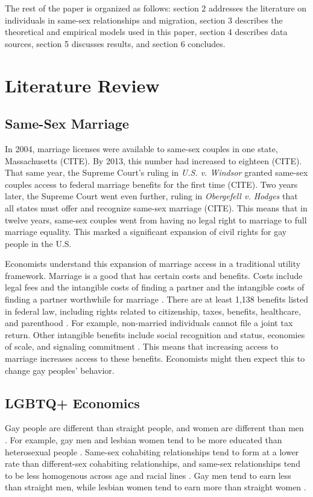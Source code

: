 \documentclass[12pt,letterpaper]{article}
\begin{document}
The rest of the paper is organized as follows: section 2 addresses the literature on individuals in same-sex relationships and migration, section 3 describes the theoretical and empirical models used in this paper, section 4 describes data sources, section 5 discusses results, and section 6 concludes.

\section{Literature Review}
\subsection{Same-Sex Marriage}
In 2004, marriage licenses were available to same-sex couples in one state, Massachusetts (CITE). By 2013, this number had increased to eighteen (CITE). That same year, the Supreme Court's ruling in \textit{U.S. v. Windsor} granted same-sex couples access to federal marriage benefits for the first time (CITE). Two years later, the Supreme Court went even further, ruling in \textit{Obergefell v. Hodges} that all states must offer and recognize same-sex marriage (CITE). This means that in twelve years, same-sex couples went from having no legal right to marriage to full marriage equality. This marked a significant expansion of civil rights for gay people in the U.S.

Economists understand this expansion of marriage access in a traditional utility framework. Marriage is a good that has certain costs and benefits. Costs include legal fees and the intangible costs of finding a partner and the intangible costs of finding a partner worthwhile for marriage \citep{9}. There are at least 1,138 benefits listed in federal law, including rights related to citizenship, taxes, benefits, healthcare, and parenthood \citep{1, 8}. For example, non-married individuals cannot file a joint tax return. Other intangible benefits include social recognition and status, economies of scale, and signaling commitment \citep{8}. This means that increasing access to marriage increases access to these benefits. Economists might then expect this to change gay peoples’ behavior. 

\subsection{LGBTQ+ Economics}

Gay people are different than straight people, and women  are different than men \citep{2, 15}. For example, gay men and lesbian women tend to be more educated than heterosexual people \citep{2, 7, 11}. Same-sex cohabiting relationships tend to form at a lower rate than different-sex cohabiting relationships, and same-sex relationships tend to be less homogenous across age and racial lines \citep{2, 7}. Gay men tend to earn less than straight men, while lesbian women tend to earn more than straight women \citep{6}.
\end{document}
